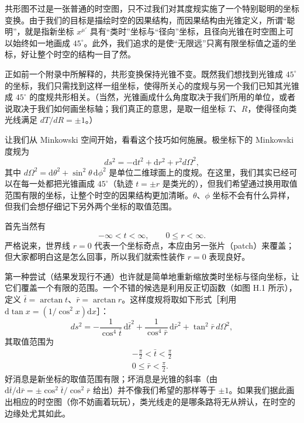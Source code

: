 共形图不过是一张普通的时空图，只不过我们对其度规实施了一个特别聪明的坐标变换。由于我们的目标是描绘时空的因果结构，而因果结构由光锥定义，所谓“聪明”，就是指新坐标 $x^{\mu'}$ 具有“类时”坐标与“径向”坐标，且径向光锥在时空图上可以始终如一地画成 $45^{\circ}$。此外，我们追求的是使“无限远”只离有限坐标值之遥的坐标，好让整个时空的结构一目了然。

正如前一个附录中所解释的，共形变换保持光锥不变。既然我们想找到光锥成 $45^{\circ}$ 的坐标，我们只需找到这样一组坐标，使得所关心的度规与另一个我们已知其光锥成 $45^{\circ}$ 的度规共形相关。（当然，光锥画成什么角度取决于我们所用的单位，或者说取决于我们如何画坐标轴；我们真正的意思，是取一组坐标 $T$、$R$，使得径向类光线满足 $dT/dR = \pm 1$。）

让我们从 Minkowski 空间开始，看看这个技巧如何施展。极坐标下的 Minkowski 度规为
\begin{equation*}
ds^{2} = -\mathrm{d}t^{2} + \mathrm{d}r^{2} + r^{2}d\Omega^{2},
\tag{H.1}
\end{equation*}
其中 $d\Omega^{2} = \mathrm{d}\theta^{2} + \sin^{2}\theta\,\mathrm{d}\phi^{2}$ 是单位二维球面上的度规。在这里，我们其实已经可以在每一处都把光锥画成 $45^{\circ}$（轨迹 $t = \pm r$ 是类光的），但我们希望通过换用取值范围有限的坐标，让整个时空的因果结构更加清晰。$\theta$、$\phi$ 坐标不会有什么异样，但我们会想仔细记下另外两个坐标的取值范围。

首先当然有
\begin{equation*}
-\infty < t < \infty, \qquad 0 \le r < \infty.
\tag{H.2}
\end{equation*}
严格说来，世界线 $r = 0$ 代表一个坐标奇点，本应由另一张片（patch）来覆盖；但大家都明白这是怎么回事，所以我们就索性装作 $r = 0$ 表现良好。

第一种尝试（结果发现行不通）也许就是简单地重新缩放类时坐标与径向坐标，让它们覆盖一个有限的范围。一个不错的候选是利用反正切函数（如图 H.1 所示），定义 $\bar{t} = \arctan t$、$\bar{r} = \arctan r$。这样度规将取如下形式［利用 $\mathrm{d}\tan x = (1/\cos^{2}x)\mathrm{d}x$］：
\begin{equation*}
ds^{2} = -\frac{1}{\cos^{4}\bar{t}}\,\mathrm{d}\bar{t}^{2} + \frac{1}{\cos^{4}\bar{r}}\,\mathrm{d}\bar{r}^{2} + \tan^{2}\bar{r}\,d\Omega^{2},
\tag{H.3}
\end{equation*}
其取值范围为
\begin{equation*}
\begin{gathered}
-\frac{\pi}{2} < \bar{t} < \frac{\pi}{2} \\
0 \le \bar{r} < \frac{\pi}{2}.
\end{gathered}
\tag{H.4}
\end{equation*}
好消息是新坐标的取值范围有限；坏消息是光锥的斜率（由 $\mathrm{d}\bar{t}/\mathrm{d}\bar{r} = \pm\cos^{2}\bar{t}/\cos^{2}\bar{r}$ 给出）并不像我们希望的那样等于 $\pm 1$。如果我们据此画出相应的时空图（你不妨画着玩玩），类光线走的是哪条路将无从辨认，在时空的边缘处尤其如此。

